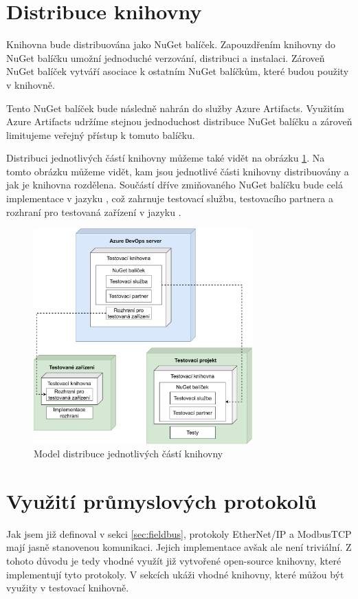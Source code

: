 \section{Distribuce knihovny}

Knihovna bude distribuována jako NuGet balíček. Zapouzdřením knihovny do NuGet balíčku umožní jednoduché verzování, distribuci a instalaci. Zároveň NuGet balíček vytváří asociace k ostatním NuGet balíčkům, které budou použity v knihovně.

Tento NuGet balíček bude následně nahrán do služby Azure Artifacts. Využitím Azure Artifacts udržíme stejnou jednoduchost distribuce NuGet balíčku a zároveň limitujeme veřejný přístup k tomuto balíčku. 

Distribuci jednotlivých částí knihovny můžeme také vidět na obrázku \ref{fig:deploymodel}. Na tomto obrázku můžeme vidět, kam jsou jednotlivé části knihovny distribuovány a jak je knihovna rozdělena. Součástí dříve zmiňovaného NuGet balíčku bude celá implementace v jazyku \csharp{}, což zahrnuje testovací službu, testovacího partnera a rozhraní pro testovaná zařízení v jazyku \csharp{}. 

\begin{figure}[H]
    \centering 
    \includegraphics[width=0.75\textwidth]{assets/img/deploymentmodel.pdf}
    \caption{Model distribuce jednotlivých částí knihovny}
    \label{fig:deploymodel}
\end{figure}


\section{Využití průmyslových protokolů}
Jak jsem již definoval v sekci \ref{sec:fieldbus}, protokoly EtherNet/IP a ModbusTCP mají jasně stanovenou komunikaci. Jejich implementace avšak ale není triviální. Z tohoto důvodu je tedy vhodné využít již vytvořené open-source knihovny, které implementují tyto protokoly. V sekcích ukáži vhodné knihovny, které můžou být využity v testovací knihovně.

